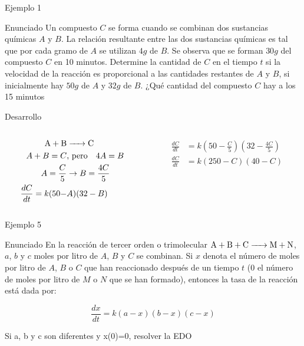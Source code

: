 \documentclass[
  10pt,
  ignorenonframetext,
  aspectratio=169,
]{beamer}
\begin{document}
\begin{frame}{Ejemplo 1}
\label{ejemplo-1}
\begin{block}{Enunciado}
\label{enunciado}
Un compuesto \(C\) se forma cuando se combinan dos sustancias químicas
\(A\) y \(B\). La relación resultante entre las dos sustancias químicas
es tal que por cada gramo de \(A\) se utilizan \(4 g\) de \(B\). Se
observa que se forman \(30 g\) del compuesto \(C\) en 10 minutos.
Determine la cantidad de \(C\) en el tiempo \(t\) si la velocidad de la
reacción es proporcional a las cantidades restantes de \(A\) y \(B\), si
inicialmente hay \(50 g\) de \(A\) y \(32 g\) de \(B\). ¿Qué cantidad
del compuesto \(C\) hay a los 15 minutos
\end{block}

\begin{block}{Desarrollo}
\label{desarrollo}
\begin{columns}[T]
\begin{column}{0.48\textwidth}
\[\begin{split}
\ce{A + B & -> C} \\
A + B = C & \text{, pero} \quad 4A = B \\
A = \frac{C}{5} & \rightarrow{} B = \frac{4C}{5} \\
\frac{dC}{dt} = k(50 - & A)(32 - B) \\
\end{split}\]
\end{column}

\begin{column}{0.48\textwidth}
\[\begin{split}
\frac{dC}{dt} & = k\left(50 - \frac{C}{5}\right) \left(32 - \frac{4C}{5}\right) \\
\frac{dC}{dt} & = k(250 - C)(40 - C) \\
\end{split}\]
\end{column}
\end{columns}
\end{block}
\end{frame}

\begin{frame}{Ejemplo 5}
\label{ejemplo-5}
\begin{block}{Enunciado}
\label{enunciado-1}
En la reacción de tercer orden o trimolecular
\(\ce{A + B + C -> M + N}\), \(a\), \(b\) y \(c\) moles por litro de
\(A\), \(B\) y \(C\) se combinan. Si \(x\) denota el número de moles por
litro de \(A\), \(B\) o \(C\) que han reaccionado después de un tiempo
\(t\) (0 el número de moles por litro de \(M\) o \(N\) que se han
formado), entonces la tasa de la reacción está dada por:

\[\dfrac{dx}{dt}=k(a-x)(b-x)(c-x)\]

Si a, b y c son diferentes y x(0)=0, resolver la EDO
\end{block}
\end{frame}
\end{document}
